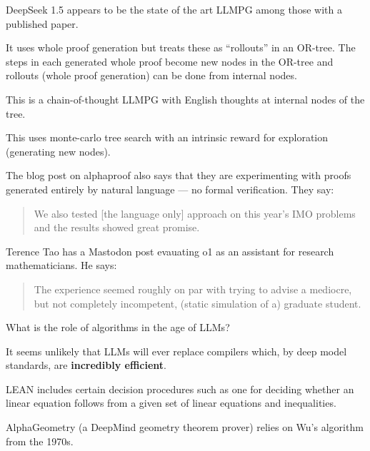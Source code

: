 {

DeepSeek 1.5 appears to be the state of the art LLMPG among those with a published paper.

\vfill
It uses whole proof generation but treats these as ``rollouts'' in an OR-tree.  The steps in each generated whole proof
become new nodes in the OR-tree and rollouts (whole proof generation) can be done from internal nodes.

\vfill
This is a chain-of-thought LLMPG with English thoughts at internal nodes of the tree.

\vfill
This uses monte-carlo tree search with an intrinsic reward for exploration (generating new nodes).


The blog post on alphaproof also says that they are experimenting with proofs generated entirely by natural language --- no formal verification.  They say:

\vfill

\begin{quotation}
We also tested [the language only] approach on this year’s IMO problems and the results showed great promise.
\end{quotation}


Terence Tao has a Mastodon post evauating o1 as an assistant for research mathematicians. He says:

\vfill
\begin{quotation}
The experience seemed roughly on par with trying to advise a mediocre, but not completely incompetent, (static simulation of a) graduate student.
\end{quotation}


What is the role of algorithms in the age of LLMs?

\vfill
It seems unlikely that LLMs will ever replace compilers which, by deep model standards, are {\bf incredibly efficient}.

\vfill
LEAN includes certain decision procedures such as one for deciding whether an linear equation
follows from a given set of linear equations and inequalities.

\vfill
AlphaGeometry (a DeepMind geometry theorem prover) relies on Wu's algorithm from the 1970s.


}
